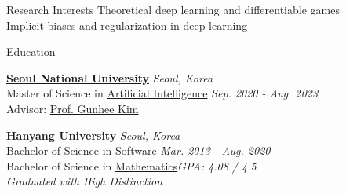 \documentclass{resume} %
\begin{document}
	
	

\begin{rSection}{Research Interests}
	Theoretical deep learning and differentiable games\\
	Implicit biases and regularization in deep learning
\end{rSection}
	


\begin{rSection}{Education}

{\bf \href{https://www.snu.ac.kr/index.html}{Seoul National University}} \hfill{\em Seoul, Korea} \\
Master of Science in \href{https://gsai.snu.ac.kr/}{Artificial Intelligence} \hfill {\em Sep. 2020 - Aug. 2023} \\ 
Advisor: \href{https://vision.snu.ac.kr/gunhee/}{Prof. Gunhee Kim}


{\bf \href{https://www.hanyang.ac.kr/}{Hanyang University}} \hfill{\em Seoul, Korea} \\
Bachelor of Science in \href{http://cs.hanyang.ac.kr/}{Software} \hfill {\em Mar. 2013 - Aug. 2020} \\ 
Bachelor of Science in \href{http://math.hanyang.ac.kr}{Mathematics}\hfill{\em GPA: 4.08 / 4.5} \\
\textit{Graduated with High Distinction}
\end{rSection}

\end{document}
